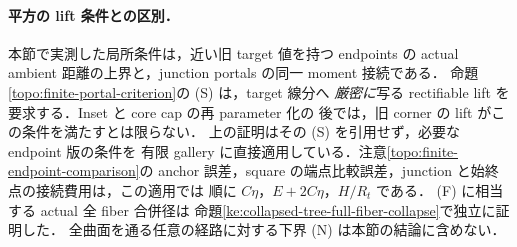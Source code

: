 \paragraph{平方の lift 条件との区別．}
本節で実測した局所条件は，近い旧 target 値を持つ endpoints の
actual ambient 距離の上界と，junction portals の同一 moment 接続である．
命題\ref{topo:finite-portal-criterion}の \textup{(S)} は，target 線分へ
\emph{厳密に}写る rectifiable lift を要求する．Inset と core cap の再 parameter 化の
後では，旧 corner の lift がこの条件を満たすとは限らない．
上の証明はその \textup{(S)} を引用せず，必要な endpoint 版の条件を
有限 gallery に直接適用している．注意\ref{topo:finite-endpoint-comparison}の
anchor 誤差，square の端点比較誤差，junction と始終点の接続費用は，この適用では
順に $C\eta$，$E+2C\eta$，$H/R_t$ である．
\textup{(F)} に相当する actual 全 fiber 合併径は
命題\ref{ke:collapsed-tree-full-fiber-collapse}で独立に証明した．
全曲面を通る任意の経路に対する下界 \textup{(N)} は本節の結論に含めない．
